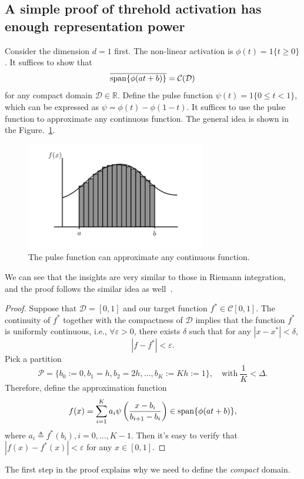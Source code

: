 \subsection{A simple proof of threhold activation has enough representation power}
Consider the dimension $d=1$ first.
The non-linear activation is $\phi(t)=1\{t\ge0\}$.
It suffices to show that
\[
\overline{\operatorname{span}\{\phi(at+b)\}} =  \mathcal{C}(\mathcal{D})
\]
for any compact domain $\mathcal{D}\in\mathbb{R}$.
Define the pulse function $\psi(t) = 1\{0\le t<1\}$, which can be expressed as $\psi=\phi(t) - \phi(1-t)$.
It suffices to use the pulse function to approximate any continuous function. 
The general idea is shown in the Figure.~\ref{fig:7:1}.
\begin{figure}[H]
\centering
\includegraphics[width=0.7\textwidth]{Seventh_lecture/f_1}
\caption{The pulse function can approximate any continuous function.}
\label{fig:7:1}
\end{figure}
We can see that the insights are very similar to those in Riemann integration, and the proof follows the similar idea as well~\citep[Theorem~(6.4)]{jiewang20191}.

\begin{proof}
Suppose that $\mathcal{D}=[0,1]$ and our target function $f^*\in\mathcal{C}[0,1]$.
The continuity of $f^*$ together with the compactness of $\mathcal{D}$ implies that the function $f^*$ is uniformly continuous, i.e., $\forall\varepsilon>0$, there exists $\delta$ such that for any $|x-x^*|<\delta$, 
\[
|f - f^*|<\varepsilon.
\]
Pick a partition 
\[
\mathcal{P}=\{b_0:=0,b_1=h,b_2=2h,\dots,b_K:=Kh:=1\},\quad
\text{with}~\frac{1}{K}<\Delta.
\]
Therefore, define the approximation function
\[
f(x) = \sum_{i=1}^Ka_i\psi\left(\frac{x-b_i}{b_{i+1} - b_i}\right)\in\operatorname{span}\{\phi(at+b)\},
\]
where $a_i\triangleq f^*(b_i), i=0,\dots,K-1$.
Then it's easy to verify that $|f(x) - f^*(x)|<\varepsilon$ for any $x\in[0,1]$.
\end{proof}
\begin{remark}
The first step in the proof explains why we need to define the \emph{compact} domain.
\end{remark}

